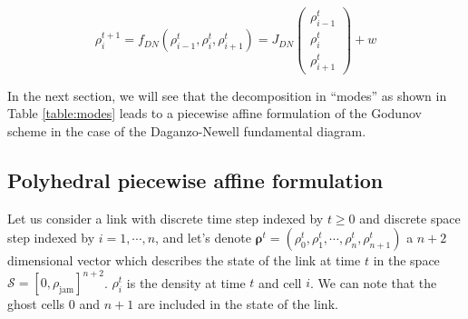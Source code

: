 \begin{equation}
\rho^{t+1}_{i} = f_{DN}(\rho^{t}_{i-1},\rho^{t}_{i},\rho^{t}_{i+1}) = J_{DN}\left( \begin{array}{c}
\rho^{t}_{i-1}\\
\rho^{t}_{i}\\
\rho^{t}_{i+1}
\end{array} \right)
+ w
\label{eq:fDN}
\end{equation}

In the next section, we will see that the decomposition in ``modes'' as shown in Table \ref{table:modes} leads to a piecewise affine formulation of the Godunov scheme in the case of the Daganzo-Newell fundamental diagram.


\subsection{Polyhedral piecewise affine formulation}\label{sec:formulation}

Let us consider a link with discrete time step indexed by $t\geq 0$ and discrete space step indexed by $i = 1,\cdots,n$, and let's denote $\boldsymbol\rho^{t} = (\rho^{t}_{0},\rho^{t}_{1},\cdots,\rho^{t}_{n},\rho^{t}_{n+1})$ a $n+2$ dimensional vector which describes the state of the link at time $t$ in the space $\mathcal{S} = [0,\rho_{\text{jam}}]^{n+2}$. $\rho^{t}_{i}$ is the density at time $t$ and cell $i$. We can note that the ghost cells $0$ and $n+1$ are included in the state of the link\footnotemark.



